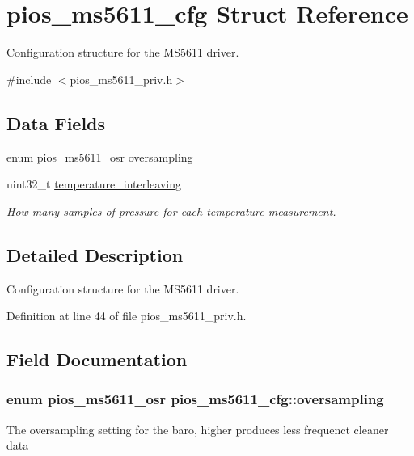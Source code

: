 \hypertarget{structpios__ms5611__cfg}{\section{pios\-\_\-ms5611\-\_\-cfg \-Struct \-Reference}
\label{structpios__ms5611__cfg}
}


\-Configuration structure for the \-M\-S5611 driver.  




{\ttfamily \#include $<$pios\-\_\-ms5611\-\_\-priv.\-h$>$}

\subsection*{\-Data \-Fields}
\begin{DoxyCompactItemize}
\item 
enum \hyperlink{group___p_i_o_s___m_s5611_gab2c6484befa4b5993218d392d4db0bd3}{pios\-\_\-ms5611\-\_\-osr} \hyperlink{structpios__ms5611__cfg_a07e19545d4961ed113e3413ad0c4965c}{oversampling}
\item 
uint32\-\_\-t \hyperlink{structpios__ms5611__cfg_a9e5737bd6a7bb20da4ac013fb0726845}{temperature\-\_\-interleaving}
\begin{DoxyCompactList}\small\item\em \-How many samples of pressure for each temperature measurement. \end{DoxyCompactList}\end{DoxyCompactItemize}


\subsection{\-Detailed \-Description}
\-Configuration structure for the \-M\-S5611 driver. 

\-Definition at line 44 of file pios\-\_\-ms5611\-\_\-priv.\-h.



\subsection{\-Field \-Documentation}
\hypertarget{structpios__ms5611__cfg_a07e19545d4961ed113e3413ad0c4965c}{
\subsubsection[{oversampling}]{\setlength{\rightskip}{0pt plus 5cm}enum {\bf pios\-\_\-ms5611\-\_\-osr} {\bf pios\-\_\-ms5611\-\_\-cfg\-::oversampling}}}\label{structpios__ms5611__cfg_a07e19545d4961ed113e3413ad0c4965c}
\-The oversampling setting for the baro, higher produces less frequenct cleaner data 

